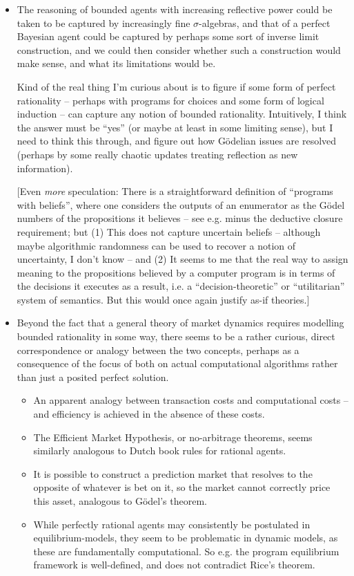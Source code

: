 \documentclass{article}
\begin{document}
\begin{itemize}

    \item The reasoning of bounded agents with increasing reflective power could be taken to be captured by increasingly fine $\sigma$-algebras, and that of a perfect Bayesian agent could be captured by perhaps some sort of inverse limit construction, and we could then consider whether such a construction would make sense, and what its limitations would be.

    Kind of the real thing I'm curious about is to figure if some form of perfect rationality -- perhaps with programs for choices and some form of logical induction -- can capture any notion of bounded rationality. Intuitively, I think the answer must be ``yes'' (or maybe at least in some limiting sense), but I need to think this through, and figure out how G\"odelian issues are resolved (perhaps by some really chaotic updates treating reflection as new information).

    [Even \emph{more} speculation: There is a straightforward definition of ``programs with beliefs'', where one considers the outputs of an enumerator as the G\"odel numbers of the propositions it believes -- see e.g. \cite{Feferman2006} minus the deductive closure requirement; but (1) This does not capture uncertain beliefs -- although maybe algorithmic randomness can be used to recover a notion of uncertainty, I don't know -- and (2) It seems to me that the real way to assign meaning to the propositions believed by a computer program is in terms of the decisions it executes as a result, i.e. a ``decision-theoretic'' or ``utilitarian'' system of semantics. But this would once again justify as-if theories.]
    
    \item Beyond the fact that a general theory of market dynamics requires modelling bounded rationality in some way, there seems to be a rather curious, direct correspondence or analogy between the two concepts, perhaps as a consequence of the focus of both on actual computational algorithms rather than just a posited perfect solution. 

    \begin{itemize}
        \item An apparent analogy between transaction costs and computational costs -- and efficiency is achieved in the absence of these costs.
        \item The Efficient Market Hypothesis, or no-arbitrage theorems, seems similarly analogous to Dutch book rules for rational agents. 
        \item It is possible to construct a prediction market that resolves to the opposite of whatever is bet on it, so the market cannot correctly price this asset, analogous to G\"odel's theorem.
        \item While perfectly rational agents may consistently be postulated in equilibrium-models, they seem to be problematic in dynamic models, as these are fundamentally computational. So e.g. the program equilibrium \cite{Tennenholtz2004} framework is well-defined, and does not contradict Rice's theorem.
    \end{itemize}


\end{itemize}
\end{document}
